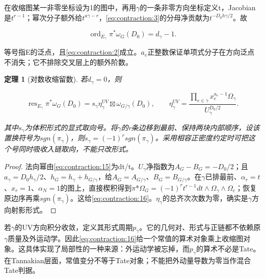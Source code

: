 \documentclass[11pt,a4paper,oneside]{ctexart}
\theoremstyle{cnplain}
\newtheorem{theorem}{定理}[section]
\theoremstyle{definition}
\theoremstyle{remark}
\numberwithin{equation}{section}
\begin{document}
在收缩图某一非零坐标设为1的图中，再用\(\gamma \)的一条非零方向坐标定义t，Jacobian是\(t^{r- 1}\)；幂次分子额外给\(t^{a\gamma - r}\)，\eqref{eq:contraction:3}的分母净贡献为\(t^{- D_0h\gamma /2}\)。故

\begin{equation}
\operatorname{ord}_{E_\gamma}\pi^*\omega_G(D_0)
                                  =d_\gamma-1.                 \label{eq:contraction:15}
\end{equation}

等号指E的泛点，且\eqref{eq:contraction:2}成立。\(a_e\)正整数保证单项式分子在方向泛点不消失；它不排除交叉层上的额外阶数。

\begin{theorem}[对数收缩留数]

\label{thm:contraction:4.1} 若\(d_\gamma =0\)，则

\begin{equation}
\operatorname{res}_{E_\gamma}\pi^*\omega_G(D_0)
       =s_\gamma\eta_\gamma^{UV}\boxtimes\omega_{G/\gamma}(D_0),\qquad
 \eta_\gamma^{UV}=\frac{\prod_{e\in\gamma}x_e^{a_e-1}\Omega_\gamma}
                                      {U_\gamma^{D_0/2}}.        \label{eq:contraction:16}
\end{equation}

其中\(s_\gamma \)为体积形式的显式取向号。将\(\gamma \)的r条边移到最前、保持两块内部顺序，设该置换符号为\(sgn(\pi _\gamma )\)，则\(s_\gamma =(- 1)^r sgn(\pi _\gamma )\)。采用相容正密度约定时可把这个号同时吸收入链取向，不能只改形式。

\end{theorem}

\begin{proof}

法向幂由\eqref{eq:contraction:15}为dt/t。\(U_\gamma \)净指数为\(A_G- B_G=- D_0/2\)；且\(a_\gamma =D_0h_\gamma /2\)、\(h_G=h_\gamma +h_{G/\gamma }\)，给\(A_G=A_{G/\gamma }\)、\(B_G=B_{G/\gamma }\)。在\(\gamma \)已排最前、\(\alpha _r=t\)、\(x_r=1\)、\(\alpha _N=1\)的图上，直接楔积得到\(\pi \)*\(\Omega _G=(- 1)^r t^{r- 1}dt\wedge \Omega _\gamma \wedge \Omega _c\)；恢复原边序再乘\(sgn(\pi _\gamma )\)。这给\eqref{eq:contraction:16}。\(\eta _\gamma \)的总齐次次数为零，确实是\(\gamma \)方向射影形式。

\end{proof}

若\(\gamma \)的UV方向积分收敛，定义其形式周期\(p_\gamma \)。它的几何对、形式与正链都不依赖原\(\gamma \)质量及外运动学。因此\eqref{eq:contraction:16}给一个常值的算术对象乘上收缩图对象。这具体实现了局部性的一种来源：外运动学被忘掉，而\(p_\gamma \)的算术不必是Tate。在Tannakian层面，常值变分不等于Tate对象；不能把外动量导数为零当作混合Tate判据。
\end{document}
